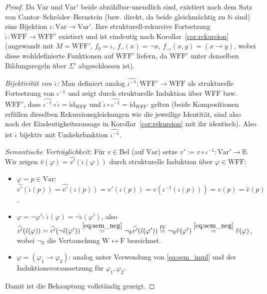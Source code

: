 \documentclass[12pt, a4paper]{article}
\theoremstyle{definition}
\theoremstyle{remark}
\newcommand{\W}{\mathrm{W}}
\newcommand{\F}{\mathrm{F}}
\newcommand{\N}{\mathbb{N}}
\newcommand{\WFF}{\mathrm{WFF}}
\newcommand{\Var}{\mathrm{Var}}
\newcommand{\Bel}{\mathrm{Bel}}
\begin{document}
\begin{proof}
Da $\Var$ und $\Var'$ beide abzählbar-unendlich sind, existiert nach dem Satz von Cantor--Schröder--Bernstein (bzw. direkt, da beide gleichmächtig zu $\N$ sind) eine Bijektion $\iota: \Var \to \Var'$. Ihre strukturell-rekursive Fortsetzung $\hat\iota: \WFF \to \WFF'$ existiert und ist eindeutig nach Korollar~\ref{cor:rekursion} (angewandt mit $M=\WFF'$, $f_0=\iota$, $f_\neg(x)=\neg x$, $f_\to(x,y)=(x\to y)$, wobei diese wohldefinierte Funktionen auf $\WFF'$ liefern, da $\WFF'$ unter denselben Bildungsregeln über $\Sigma'$ abgeschlossen ist).

\emph{Bijektivität von $\hat\iota$:} Man definiert analog $\hat{\iota^{-1}}: \WFF' \to \WFF$ als strukturelle Fortsetzung von $\iota^{-1}$ und zeigt durch strukturelle Induktion über $\WFF$ bzw. $\WFF'$, dass $\hat{\iota^{-1}} \circ \hat\iota = \mathrm{id}_{\WFF}$ und $\hat\iota \circ \hat{\iota^{-1}} = \mathrm{id}_{\WFF'}$ gelten (beide Kompositionen erfüllen dieselben Rekursionsgleichungen wie die jeweilige Identität, sind also nach der Eindeutigkeitsaussage in Korollar~\ref{cor:rekursion} mit ihr identisch). Also ist $\hat\iota$ bijektiv mit Umkehrfunktion $\hat{\iota^{-1}}$.

\emph{Semantische Verträglichkeit:} Für $v \in \Bel$ (auf $\Var$) setze $v' := v \circ \iota^{-1} : \Var' \to \mathbb{B}$. Wir zeigen $\hat v(\varphi) = \widehat{v'}(\hat\iota(\varphi))$ durch strukturelle Induktion über $\varphi \in \WFF$:
\begin{itemize}
  \item $\varphi = p \in \Var$: $\widehat{v'}(\hat\iota(p)) = \widehat{v'}(\iota(p)) = v'(\iota(p)) = v(\iota^{-1}(\iota(p))) = v(p) = \hat v(p)$.
  \item $\varphi = \neg\varphi'$: $\hat\iota(\varphi) = \neg\hat\iota(\varphi')$, also $\widehat{v'}(\hat\iota(\varphi)) = \widehat{v'}(\neg\hat\iota(\varphi'))\overset{\eqref{eq:sem_neg}}{=} \lnot_{\mathbb{B}}\widehat{v'}(\hat\iota(\varphi')) \overset{\text{IV}}{=} \lnot_{\mathbb{B}} \hat v(\varphi') \overset{\eqref{eq:sem_neg}}{=} \hat v(\varphi)$, wobei $\lnot_\mathbb{B}$ die Vertauschung $\W\leftrightarrow\F$ bezeichnet.
  \item $\varphi = (\varphi_1\to\varphi_2)$: analog unter Verwendung von \eqref{eq:sem_impl} und der Induktionsvoraussetzung für $\varphi_1,\varphi_2$.
\end{itemize}
Damit ist die Behauptung vollständig gezeigt.
\end{proof}
\end{document}
